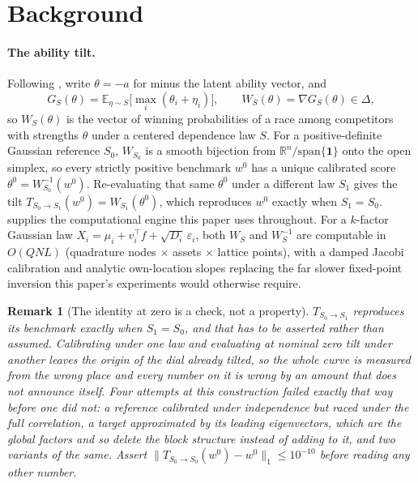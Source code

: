\documentclass[11pt]{article}
\newcommand{\E}{\mathbb{E}}
\newcommand{\R}{\mathbb{R}}
\newtheorem{remark}{Remark}
\begin{document}
\section{Background}

\paragraph{The ability tilt.} Following \textcite{cotton2026polish}, write
$\theta=-a$ for minus the latent ability vector, and
\[
  G_S(\theta) = \E_{\eta\sim S}\big[\max_i(\theta_i+\eta_i)\big], \qquad
  W_S(\theta) = \nabla G_S(\theta) \in \Delta,
\]
so $W_S(\theta)$ is the vector of winning probabilities of a race among
competitors with strengths $\theta$ under a centered dependence law $S$. For
a positive-definite Gaussian reference $S_0$, $W_{S_0}$ is a smooth bijection
from $\R^n/\mathrm{span}\{\mathbf 1\}$ onto the open simplex, so every
strictly positive benchmark $w^0$ has a unique calibrated score
$\theta^0=W_{S_0}^{-1}(w^0)$. Re-evaluating that same $\theta^0$ under a
different law $S_1$ gives the tilt $T_{S_0\to S_1}(w^0)=W_{S_1}(\theta^0)$,
which reproduces $w^0$ exactly when $S_1=S_0$.
\textcite{cotton2026factorprobit} supplies the computational engine this
paper uses throughout. For a $k$-factor Gaussian law
$X_i=\mu_i+v_i^\top f+\sqrt{D_i}\,\varepsilon_i$, both $W_S$ and $W_S^{-1}$
are computable in $O(QNL)$ (quadrature nodes $\times$ assets $\times$ lattice
points), with a damped Jacobi calibration and analytic own-location slopes
replacing the far slower fixed-point inversion this paper's experiments would
otherwise require.

\begin{remark}[The identity at zero is a check, not a property]
$T_{S_0\to S_1}$ reproduces its benchmark exactly when $S_1 = S_0$, and that
has to be asserted rather than assumed. Calibrating under one law and
evaluating at nominal zero tilt under another leaves the origin of the dial
already tilted, so the whole curve is measured from the wrong place and every
number on it is wrong by an amount that does not announce itself. Four
attempts at this construction failed exactly that way before one did not: a
reference calibrated under independence but raced under the full correlation,
a target approximated by its leading eigenvectors, which are the global
factors and so delete the block structure instead of adding to it, and two
variants of the same. Assert $\|T_{S_0\to S_0}(w^0) - w^0\|_1 \le 10^{-10}$
before reading any other number.
\end{remark}
\end{document}
